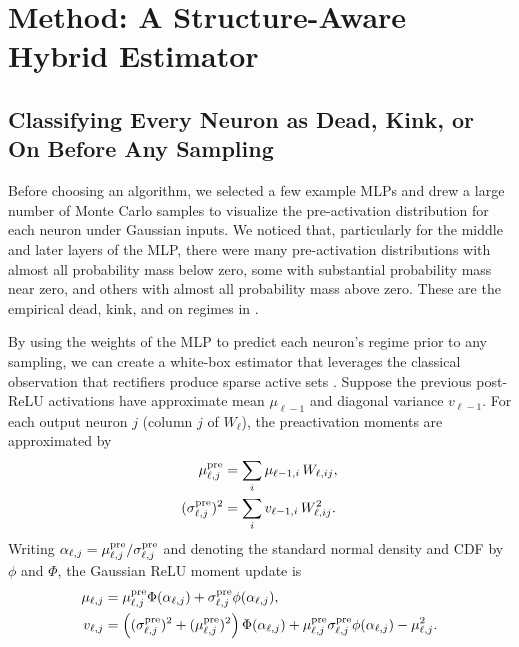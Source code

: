 \section{Method: A Structure-Aware Hybrid Estimator}
\label{sec:method}

\subsection{Classifying Every Neuron as Dead, Kink, or On Before Any Sampling}

Before choosing an algorithm, we selected a few example MLPs and drew a large number of Monte Carlo samples to visualize the pre-activation distribution for each neuron under Gaussian inputs. We noticed that, particularly for the middle and later layers of the MLP, there were many pre-activation distributions with almost all probability mass below zero, some with substantial probability mass near zero, and others with almost all probability mass above zero. These are the empirical dead, kink, and on regimes in .

By using the weights of the MLP to predict each neuron's regime prior to any sampling, we can create a white-box estimator that leverages the classical observation that rectifiers produce sparse active sets \citep{nair2010rectified,glorot2011deep}. Suppose the previous post-ReLU activations have approximate mean $\mu_{\ell-1}$ and diagonal variance $v_{\ell-1}$. For each output neuron $j$ (column $j$ of $W_\ell$), the preactivation moments are approximated by
\begin{align}
    \mu_{\ell,j}^{\rm pre} &= \sum_i \mu_{\ell-1,i}\,W_{\ell,ij}, \label{eq:pre-mean}\\
    (\sigma_{\ell,j}^{\rm pre})^2 &= \sum_i v_{\ell-1,i}\,W_{\ell,ij}^2. \label{eq:pre-var}
\end{align}
Writing $\alpha_{\ell,j}=\mu_{\ell,j}^{\rm pre}/\sigma_{\ell,j}^{\rm pre}$ and denoting the standard normal density and CDF by $\phi$ and $\Phi$, the Gaussian ReLU moment update is
\begin{align}
    \mu_{\ell,j}
    &= \mu_{\ell,j}^{\rm pre}\Phi(\alpha_{\ell,j})
       + \sigma_{\ell,j}^{\rm pre}\phi(\alpha_{\ell,j}), \label{eq:post-mean}\\
    v_{\ell,j}
    &= \left((\sigma_{\ell,j}^{\rm pre})^2+(\mu_{\ell,j}^{\rm pre})^2\right)\Phi(\alpha_{\ell,j})
       + \mu_{\ell,j}^{\rm pre}\sigma_{\ell,j}^{\rm pre}\phi(\alpha_{\ell,j})
       - \mu_{\ell,j}^2. \label{eq:post-var}
\end{align}

